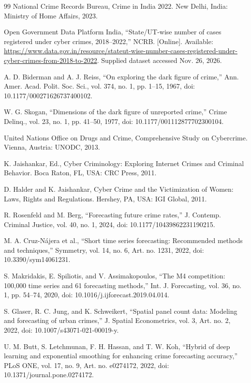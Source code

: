 \begin{thebibliography}{99}
 National Crime Records Bureau, Crime in India 2022. New Delhi, India: Ministry of Home Affairs, 2023.

 Open Government Data Platform India, ``State/UT-wise number of cases registered under cyber crimes, 2018--2022,'' NCRB. [Online]. Available: \url{https://www.data.gov.in/resource/stateut-wise-number-cases-registered-under-cyber-crimes-from-2018-to-2022}. Supplied dataset accessed Nov. 26, 2026.

 A. D. Biderman and A. J. Reiss, ``On exploring the dark figure of crime,'' Ann. Amer. Acad. Polit. Soc. Sci., vol. 374, no. 1, pp. 1--15, 1967, doi: 10.1177/000271626737400102.

 W. G. Skogan, ``Dimensions of the dark figure of unreported crime,'' Crime Delinq., vol. 23, no. 1, pp. 41--50, 1977, doi: 10.1177/001112877702300104.

 United Nations Office on Drugs and Crime, Comprehensive Study on Cybercrime. Vienna, Austria: UNODC, 2013.

 K. Jaishankar, Ed., Cyber Criminology: Exploring Internet Crimes and Criminal Behavior. Boca Raton, FL, USA: CRC Press, 2011.

 D. Halder and K. Jaishankar, Cyber Crime and the Victimization of Women: Laws, Rights and Regulations. Hershey, PA, USA: IGI Global, 2011.

 R. Rosenfeld and M. Berg, ``Forecasting future crime rates,'' J. Contemp. Criminal Justice, vol. 40, no. 1, 2024, doi: 10.1177/10439862231190215.

 M. A. Cruz-Nájera et al., ``Short time series forecasting: Recommended methods and techniques,'' Symmetry, vol. 14, no. 6, Art. no. 1231, 2022, doi: 10.3390/sym14061231.

 S. Makridakis, E. Spiliotis, and V. Assimakopoulos, ``The M4 competition: 100,000 time series and 61 forecasting methods,'' Int. J. Forecasting, vol. 36, no. 1, pp. 54--74, 2020, doi: 10.1016/j.ijforecast.2019.04.014.

 S. Glaser, R. C. Jung, and K. Schweikert, ``Spatial panel count data: Modeling and forecasting of urban crimes,'' J. Spatial Econometrics, vol. 3, Art. no. 2, 2022, doi: 10.1007/s43071-021-00019-y.

 U. M. Butt, S. Letchmunan, F. H. Hassan, and T. W. Koh, ``Hybrid of deep learning and exponential smoothing for enhancing crime forecasting accuracy,'' PLoS ONE, vol. 17, no. 9, Art. no. e0274172, 2022, doi: 10.1371/journal.pone.0274172.


\end{thebibliography}
